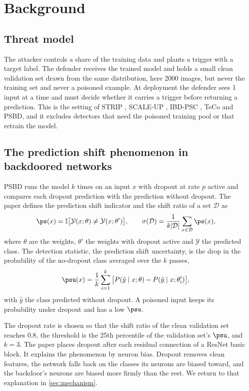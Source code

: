 \section{Background}
\label{sec:background}

\subsection{Threat model}
The attacker controls a share of the training data and plants a trigger with a target label. The defender receives the trained model and holds a small clean validation set drawn from the same distribution, here 2000 images, but never the training set and never a poisoned example. At deployment the defender sees 1 input at a time and must decide whether it carries a trigger before returning a prediction. This is the setting of STRIP \cite{gao2019strip}, SCALE-UP \cite{guo2023scale}, IBD-PSC \cite{hou2024ibdpsc}, TeCo \cite{liu2023teco} and PSBD, and it excludes detectors that need the poisoned training pool or that retrain the model.

\subsection{The prediction shift phenomenon in backdoored networks}
PSBD \cite{li2025psbd} runs the model $k$ times on an input $x$ with dropout at rate $p$ active and compares each dropout prediction with the prediction without dropout. The paper defines the prediction shift indicator and the shift ratio of a set $\mathcal{D}$ as
\begin{equation}
  \ps(x) = \mathbb{I}\big[\mathcal{Y}(x;\theta) \neq \mathcal{Y}(x;\theta')\big], \qquad
  \sigma(\mathcal{D}) = \frac{1}{k|\mathcal{D}|}\sum_{x\in\mathcal{D}} \ps(x),
\end{equation}
where $\theta$ are the weights, $\theta'$ the weights with dropout active and $\mathcal{Y}$ the predicted class. The detection statistic, the prediction shift uncertainty, is the drop in the probability of the no-dropout class averaged over the $k$ passes,
\begin{equation}
  \psu(x) = \frac{1}{k}\sum_{i=1}^{k} \big[ P(\hat y \mid x;\theta) - P(\hat y \mid x;\theta'_i) \big],
\end{equation}
with $\hat y$ the class predicted without dropout. A poisoned input keeps its probability under dropout and has a low $\psu$.

The dropout rate is chosen so that the shift ratio of the clean validation set reaches 0.8, the threshold is the 25th percentile of the validation set's $\psu$, and $k = 3$. The paper places dropout after each residual connection of a ResNet basic block. It explains the phenomenon by neuron bias. Dropout removes clean features, the network falls back on the classes its neurons are biased toward, and the backdoor's neurons are biased more firmly than the rest. We return to that explanation in \cref{sec:mechanism}.

